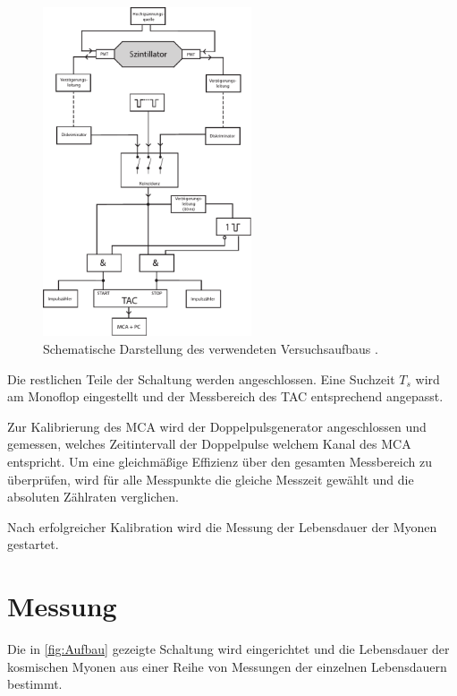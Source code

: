 \begin{figure}[H]
    \centering
    \includegraphics[width=0.55\textwidth]{content/grafik/Aufbau.pdf}
    \caption{Schematische Darstellung des verwendeten Versuchsaufbaus \cite{myon}.}
    \label{fig:Aufbau}
\end{figure}

Die restlichen Teile der Schaltung werden angeschlossen. Eine Suchzeit $T_s$ wird am Monoflop eingestellt und der Messbereich des TAC entsprechend angepasst.

Zur Kalibrierung des MCA wird der Doppelpulsgenerator angeschlossen und gemessen, welches Zeitintervall der Doppelpulse welchem Kanal des MCA entspricht. Um eine gleichmäßige Effizienz über den gesamten Messbereich zu überprüfen, wird für alle Messpunkte die gleiche Messzeit gewählt und die absoluten Zählraten verglichen.

Nach erfolgreicher Kalibration wird die Messung der Lebensdauer der Myonen gestartet.

\section{Messung}

Die in \autoref{fig:Aufbau} gezeigte Schaltung wird eingerichtet und die Lebensdauer der kosmischen Myonen aus einer Reihe von Messungen der einzelnen Lebensdauern bestimmt.
